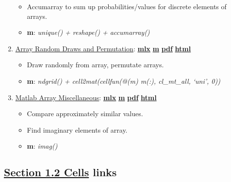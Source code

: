 \documentclass[
]{book}
\providecommand{\tightlist}{%
  \setlength{\itemsep}{0pt}\setlength{\parskip}{0pt}}
\begin{document}
\begin{enumerate}
  \begin{itemize}
  \tightlist
  \item
    Accumarray to sum up probabilities/values for discrete elements of arrays.
  \item
    \textbf{m}: \emph{unique() + reshape() + accumarray()}
  \end{itemize}
\item
  \href{https://fanwangecon.github.io/M4Econ/amto/array/htmlpdfm/fs_combi_permu.html}{Array Random Draws and Permutation}: \href{https://github.com/FanWangEcon/M4Econ/blob/master/amto/array/fs_combi_permu.mlx}{\textbf{mlx}} \textbar{} \href{https://github.com/FanWangEcon/M4Econ/blob/master/amto/array/htmlpdfm/fs_combi_permu.m}{\textbf{m}} \textbar{} \href{https://github.com/FanWangEcon/M4Econ/blob/master/amto/array/htmlpdfm/fs_combi_permu.pdf}{\textbf{pdf}} \textbar{} \href{https://fanwangecon.github.io/M4Econ/amto/array/htmlpdfm/fs_combi_permu.html}{\textbf{html}}

  \begin{itemize}
  \tightlist
  \item
    Draw randomly from array, permutate arrays.
  \item
    \textbf{m}: \emph{ndgrid() + cell2mat(cellfun(@(m) m(:), cl\_mt\_all, `uni', 0))}
  \end{itemize}
\item
  \href{https://fanwangecon.github.io/M4Econ/amto/array/htmlpdfm/fs_img.html}{Matlab Array Miscellaneous}: \href{https://github.com/FanWangEcon/M4Econ/blob/master/amto/array/fs_img.mlx}{\textbf{mlx}} \textbar{} \href{https://github.com/FanWangEcon/M4Econ/blob/master/amto/array/htmlpdfm/fs_img.m}{\textbf{m}} \textbar{} \href{https://github.com/FanWangEcon/M4Econ/blob/master/amto/array/htmlpdfm/fs_img.pdf}{\textbf{pdf}} \textbar{} \href{https://fanwangecon.github.io/M4Econ/amto/array/htmlpdfm/fs_img.html}{\textbf{html}}

  \begin{itemize}
  \tightlist
  \item
    Compare approximately similar values.
  \item
    Find imaginary elements of array.
  \item
    \textbf{m}: \emph{imag()}
  \end{itemize}
\end{enumerate}

\hypertarget{section-1.2-cellscells-links}{%
\subsection{\texorpdfstring{\protect\hyperlink{cells}{Section 1.2 Cells} links}{Section 1.2 Cells links}}\label{section-1.2-cellscells-links}}
\end{document}
